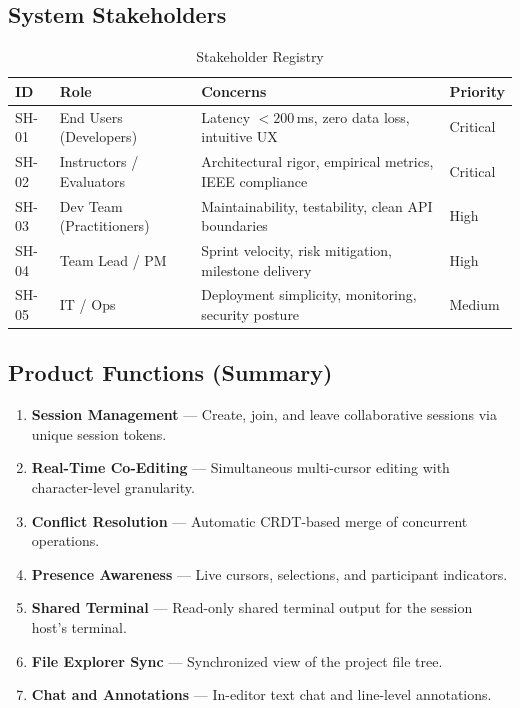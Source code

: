 \documentclass[12pt, a4paper, oneside]{article}
\begin{document}
\subsection{System Stakeholders}

\begin{table}[H]
\centering
\caption{Stakeholder Registry}
\begin{tabularx}{\textwidth}{l l X l}
\toprule
\textbf{ID} & \textbf{Role} & \textbf{Concerns} & \textbf{Priority} \\
\midrule
SH-01 & End Users (Developers) & Latency $<200$\,ms, zero data loss, intuitive UX & Critical \\
SH-02 & Instructors / Evaluators & Architectural rigor, empirical metrics, IEEE compliance & Critical \\
SH-03 & Dev Team (Practitioners) & Maintainability, testability, clean API boundaries & High \\
SH-04 & Team Lead / PM & Sprint velocity, risk mitigation, milestone delivery & High \\
SH-05 & IT / Ops & Deployment simplicity, monitoring, security posture & Medium \\
\bottomrule
\end{tabularx}
\end{table}

\subsection{Product Functions (Summary)}
\begin{enumerate}
  \item \textbf{Session Management} --- Create, join, and leave collaborative sessions via unique session tokens.
  \item \textbf{Real-Time Co-Editing} --- Simultaneous multi-cursor editing with character-level granularity.
  \item \textbf{Conflict Resolution} --- Automatic CRDT-based merge of concurrent operations.
  \item \textbf{Presence Awareness} --- Live cursors, selections, and participant indicators.
  \item \textbf{Shared Terminal} --- Read-only shared terminal output for the session host's terminal.
  \item \textbf{File Explorer Sync} --- Synchronized view of the project file tree.
  \item \textbf{Chat and Annotations} --- In-editor text chat and line-level annotations.
\end{enumerate}
\end{document}
